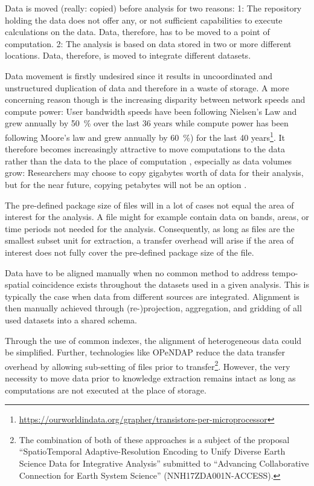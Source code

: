 \documentclass[a4paper,10pt]{article}
\begin{document}
Data is moved (really: copied) before analysis for two reasons: 
1: The repository holding the data does not offer any, or not sufficient capabilities to execute calculations on the data. Data, therefore, has to be moved to a point of computation. 
2: The analysis is based on data stored in two or more different locations. Data, therefore, is moved to integrate different datasets. 

Data movement is firstly undesired since it results in uncoordinated and unstructured duplication of data and therefore in a waste of storage.
A more concerning reason though is the increasing disparity between network speeds and compute power: User bandwidth speeds have been following Nielsen's Law \citep{Nielsen1998} and grew annually by \SI{50}{\percent} over the last 36 years while compute power has been following Moore's law \citep{Moore1975} and grew annually by \SI{60}{\percent}) for the last 40 years\footnote{\url{https://ourworldindata.org/grapher/transistors-per-microprocessor}}. It therefore becomes increasingly attractive to move computations to the data rather than the data to the place of computation \citep{Hey2009}, especially as data volumes grow: Researchers may choose to copy gigabytes worth of data for their analysis, but for the near future, copying petabytes will not be an option \citep{Szalay2006}.

The pre-defined package size of files will in a lot of cases not equal the area of interest for the analysis. A file might for example contain data on bands, areas, or time periods not needed for the analysis. Consequently, as long as files are the smallest subset unit for extraction, a transfer overhead will arise if the area of interest does not fully cover the pre-defined package size of the file.

Data have to be aligned manually when no common method to address tempo-spatial coincidence exists throughout the datasets used in a given analysis. This is typically the case when data from different sources are integrated. Alignment is then manually achieved through (re-)projection, aggregation, and gridding of all used datasets into a shared schema.

Through the use of common indexes, the alignment of heterogeneous data could be simplified. 
Further, technologies like \gls{OPeNDAP} reduce the data transfer overhead by allowing
sub-setting of files prior to transfer\footnote{The combination of both of these approaches is a subject of the proposal ``SpatioTemporal Adaptive-Resolution Encoding to Unify Diverse Earth Science Data for Integrative Analysis'' submitted to ``Advancing Collaborative Connection for Earth System Science'' (NNH17ZDA001N-ACCESS).}.
However, the very necessity to move data prior to knowledge extraction remains intact as long as computations are not executed at the place of storage.
\end{document}
